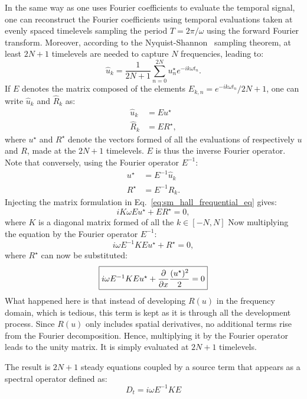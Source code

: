 In the same way as one uses Fourier coefficients to
evaluate the temporal signal,
one can reconstruct the Fourier coefficients using
temporal evaluations taken at evenly spaced timelevels
sampling the period $T = 2 \pi / \omega$ using the forward
Fourier transform. Moreover, 
according to the Nyquist-Shannon~\cite{Shannon1949} sampling theorem, 
at least $2N+1$ timelevels are needed to capture $N$ frequencies,
leading to:
\begin{equation}
	\widehat{u}_k = \frac{1}{2N+1} 
	\sum_{n=0}^{2N} u_n^\star e^{-i k \omega t_n}.
\end{equation}
If $E$ denotes the matrix composed of the elements 
$E_{k,n} = e^{-i k \omega t_n} / 2N+1$, one can write $\widehat{u}_k$
and $\widehat{R}_k$ as:
\begin{equation}
	\begin{split}
		\widehat{u}_k &= E u^\star \\
		\widehat{R}_k &= E R^\star,
	\end{split}
\end{equation}
where $u^\star$ and $R^\star$ 
denote the vectors formed of all the evaluations of respectively $u$
and $R$,
made at the $2N+1$ timelevels. $E$ is thus the inverse Fourier operator.
Note that conversely, using the Fourier operator $E^{-1}$:
\begin{equation}
	\begin{split}
		u^\star &= E^{-1} \widehat{u}_k \\
		R^\star &= E^{-1} \widehat{R}_k.
	\end{split}
\end{equation}
Injecting the matrix formulation in Eq.~\ref{eq:sm_hall_frequential_eq}
gives:
\begin{equation}
	i K \omega E u^\star + E R^\star = 0,
\end{equation}
where $K$ is a diagonal matrix formed of all the $k \in [-N, N]$
Now multiplying the equation by the Fourier operator $E^{-1}$:
\begin{equation}
	i \omega E^{-1} K E u^\star + R^\star = 0,
\end{equation}
where $R^\star$ can now be substituted:
\begin{equation}
	\fbox{$
		i \omega E^{-1} K E u^\star + 
		\displaystyle \frac{\partial}{\partial x}
		\frac{(u^\star)^2}{2} = 0
	$}
\end{equation}
What happened here is that instead of developing $R(u)$
in the frequency domain, which is tedious, this term is kept
as it is through all the development process. 
Since $R(u)$ only includes spatial derivatives, no additional terms
rise from the Fourier decomposition. Hence, multiplying it
by the Fourier operator leads to the unity matrix. It is
simply evaluated at $2N+1$ timelevels.

The result is $2N+1$ steady equations coupled by a
source term that appears as a spectral
operator defined as:
\begin{equation}
	D_t = i \omega E^{-1} K E
\end{equation}




